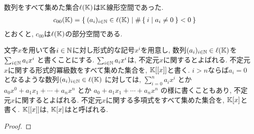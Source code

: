 \begin{example}
  数列をすべて集めた集合$\ell(\mathbb{K})$は$\mathbb{K}$線形空間であった.
  \begin{align*}
    c_{00}(\mathbb{K})&=\Set{(a_i)_{i\in\mathbb{N}} \in \ell(\mathbb{K}) | \#\Set{i| a_i \neq 0} < 0}
  \end{align*}
  とおくと, $c_{00}$は$\ell(\mathbb{K})$の部分空間である.
  
  文字$x$を用いて各$i\in\mathbb{N}$に対し形式的な記号$x^i$を用意し,
  数列$(a_i)_{i\in\mathbb{N}} \in \ell(\mathbb{K})$を
  $\sum_{i\in \mathbb{N}} a_ix^i$
  と書くことにする.
  $\sum_{i\in \mathbb{N}} a_ix^i$は,
  不定元$x$に関するとよばれる.
  不定元$x$に関する形式的冪級数をすべて集めた集合を,
  $\mathbb{K}[[x]]$と書く.
  $i>n$ならば$a_i=0$となるような数列$(a_i)_{i\in\mathbb{N}} \in \ell(\mathbb{K})$
  に対しては,
  $\sum_{i=0}^{n} a_ix^i$
  とか
  $a_0x^0+a_1x_1+\cdots+a_nx^n$
  とか
  $a_0+a_1x_1+\cdots+a_nx^n$
  の様に書くこともあり,
  不定元$x$に関するとよばれる.
  不定元$x$に関する多項式をすべて集めた集合を,
  $\mathbb{K}[x]$と書く.
  $\mathbb{K}[[x]]$は,
  $\mathbb{K}[x]$はと呼ばれる.
\end{example}
\begin{proof}\end{proof}
